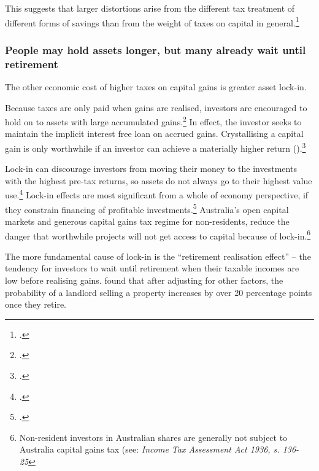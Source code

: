 \documentclass{grattan}\usepackage[]{graphicx}\usepackage[]{color}
\begin{document}
This suggests that larger distortions arise from the different tax treatment of different forms of savings than from the weight of taxes on capital in general.\footcite[p.~16]{Ingles2009} 

\subsubsection{People may hold assets longer, but many already wait until retirement}
The other economic cost of higher taxes on capital gains is greater asset lock-in. 

Because taxes are only paid when gains are realised, investors are encouraged to hold on to assets with large accumulated gains.\footcite[p.~69]{Burman2009} In effect, the investor seeks to maintain the implicit interest free loan on accrued gains. Crystallising a capital gain is only worthwhile if an investor can achieve a materially higher return ().\footcite[p.~12]{Ingles2009}

Lock-in can discourage investors from moving their money to the investments with the highest pre-tax returns, so assets do not always go to their highest value use.\footcite{Lindsey1987} Lock-in effects are most significant from a whole of economy perspective, if they constrain financing of profitable investments.\footcites{OECD2006b}{Johnson2008}  Australia's open capital markets and generous capital gains tax regime for non-residents, reduce the danger that worthwhile projects will not get access to capital because of lock-in.\footnote{Non-resident investors in Australian shares are generally not subject to Australia capital gains tax (see: \emph{Income Tax Assessment Act 1936, s. 136-25}} 

The more fundamental cause of lock-in is the ``retirement realisation effect'' -- the tendency for investors to wait until retirement when their taxable incomes are low before realising gains.
 \textcite{Wood2010a} found that after adjusting for other factors, the probability of a landlord selling a property increases by over 20 percentage points once they retire.
 
\end{document}
